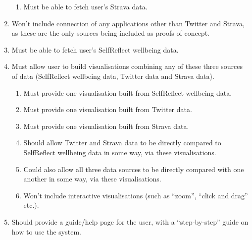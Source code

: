 \documentclass[11pt,openright,a4paper]{report}
\begin{document}
\begin{enumerate}
\begin{enumerate}
  \item Must be able to fetch user's Strava data.
  \end{enumerate}
\item Won't include connection of any applications other than Twitter and Strava, as these are the only sources being included as proofs of concept.
\item Must be able to fetch user's SelfReflect wellbeing data.
\item Must allow user to build visualisations combining any of these three sources of data (SelfReflect wellbeing data, Twitter data and Strava data).
  \begin{enumerate}
  \item Must provide one visualisation built from SelfReflect wellbeing data.
  \item Must provide one visualisation built from Twitter data.
  \item Must provide one visualisation built from Strava data.
  \item Should allow Twitter and Strava data to be directly compared to SelfReflect wellbeing data in some way, via these visualisations.
  \item Could also allow all three data sources to be directly compared with one another in some way, via these visualisations.
  \item Won't include interactive visualisations (such as \enquote{zoom}, \enquote{click and drag} etc.).
  \end{enumerate}
\item Should provide a guide/help page for the user, with a \enquote{step-by-step} guide on how to use the system.
\end{enumerate}
\end{document}
